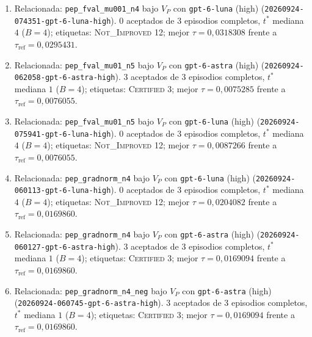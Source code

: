 \documentclass[11pt,a4paper]{article}
\begin{document}
{\begin{enumerate}
  \item Relacionada: \texttt{pep\_\allowbreak{}fval\_\allowbreak{}mu001\_\allowbreak{}n4} bajo $V_P$ con \texttt{gpt-\allowbreak{}6-\allowbreak{}luna} (high) (\texttt{20260924-\allowbreak{}074351-\allowbreak{}gpt-\allowbreak{}6-\allowbreak{}luna-\allowbreak{}high}). 0 aceptados de 3 episodios completos, $t^*$ mediana $4$ ($B = 4$); etiquetas: \textsc{Not\_Improved} 12; mejor $\tau = 0{,}0318308$ frente a $\tau_{\mathrm{ref}} = 0{,}0295431$.
  \item Relacionada: \texttt{pep\_\allowbreak{}fval\_\allowbreak{}mu01\_\allowbreak{}n5} bajo $V_P$ con \texttt{gpt-\allowbreak{}6-\allowbreak{}astra} (high) (\texttt{20260924-\allowbreak{}062058-\allowbreak{}gpt-\allowbreak{}6-\allowbreak{}astra-\allowbreak{}high}). 3 aceptados de 3 episodios completos, $t^*$ mediana $1$ ($B = 4$); etiquetas: \textsc{Certified} 3; mejor $\tau = 0{,}0075285$ frente a $\tau_{\mathrm{ref}} = 0{,}0076055$.
  \item Relacionada: \texttt{pep\_\allowbreak{}fval\_\allowbreak{}mu01\_\allowbreak{}n5} bajo $V_P$ con \texttt{gpt-\allowbreak{}6-\allowbreak{}luna} (high) (\texttt{20260924-\allowbreak{}075941-\allowbreak{}gpt-\allowbreak{}6-\allowbreak{}luna-\allowbreak{}high}). 0 aceptados de 3 episodios completos, $t^*$ mediana $4$ ($B = 4$); etiquetas: \textsc{Not\_Improved} 12; mejor $\tau = 0{,}0087266$ frente a $\tau_{\mathrm{ref}} = 0{,}0076055$.
  \item Relacionada: \texttt{pep\_\allowbreak{}gradnorm\_\allowbreak{}n4} bajo $V_P$ con \texttt{gpt-\allowbreak{}6-\allowbreak{}luna} (high) (\texttt{20260924-\allowbreak{}060113-\allowbreak{}gpt-\allowbreak{}6-\allowbreak{}luna-\allowbreak{}high}). 0 aceptados de 3 episodios completos, $t^*$ mediana $4$ ($B = 4$); etiquetas: \textsc{Not\_Improved} 12; mejor $\tau = 0{,}0204082$ frente a $\tau_{\mathrm{ref}} = 0{,}0169860$.
  \item Relacionada: \texttt{pep\_\allowbreak{}gradnorm\_\allowbreak{}n4} bajo $V_P$ con \texttt{gpt-\allowbreak{}6-\allowbreak{}astra} (high) (\texttt{20260924-\allowbreak{}060127-\allowbreak{}gpt-\allowbreak{}6-\allowbreak{}astra-\allowbreak{}high}). 3 aceptados de 3 episodios completos, $t^*$ mediana $1$ ($B = 4$); etiquetas: \textsc{Certified} 3; mejor $\tau = 0{,}0169094$ frente a $\tau_{\mathrm{ref}} = 0{,}0169860$.
  \item Relacionada: \texttt{pep\_\allowbreak{}gradnorm\_\allowbreak{}n4\_\allowbreak{}neg} bajo $V_P$ con \texttt{gpt-\allowbreak{}6-\allowbreak{}astra} (high) (\texttt{20260924-\allowbreak{}060745-\allowbreak{}gpt-\allowbreak{}6-\allowbreak{}astra-\allowbreak{}high}). 3 aceptados de 3 episodios completos, $t^*$ mediana $1$ ($B = 4$); etiquetas: \textsc{Certified} 3; mejor $\tau = 0{,}0169094$ frente a $\tau_{\mathrm{ref}} = 0{,}0169860$.

\end{enumerate}}
\end{document}
